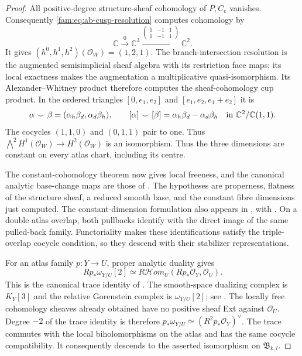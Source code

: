 \begin{proof}
All positive-degree structure-sheaf cohomology of $P,C_e$ vanishes.
Consequently \eqref{fam:eq:ab-cusp-resolution} computes cohomology by
\[
 \mathbb C\xrightarrow{0}\mathbb C^3
 \xrightarrow{\left(\begin{smallmatrix}1&-1&1\\1&-1&1\end{smallmatrix}\right)}
 \mathbb C^2.
\]
It gives $(h^0,h^1,h^2)(\mathcal O_W)=(1,2,1)$.
The branch-intersection resolution
is the augmented semisimplicial sheaf algebra with its restriction face
maps; its local exactness makes the augmentation a multiplicative
quasi-isomorphism. Its Alexander--Whitney product therefore computes
the sheaf-cohomology cup product. In the ordered triangles
$[0,e_1,e_2]$ and $[e_1,e_2,e_1+e_2]$ it is
\[
 \alpha\smile\beta=(\alpha_h\beta_d,\alpha_d\beta_h),
 \qquad [\alpha]\smile[\beta]
 =\alpha_h\beta_d-\alpha_d\beta_h
 \quad\hbox{in }\mathbb C^2/\mathbb C(1,1).
\]
The cocycles $(1,1,0)$ and $(0,1,1)$ pair to one. Thus
$\bigwedge^2H^1(\mathcal O_W)\to H^2(\mathcal O_W)$ is an
isomorphism.
Thus the three dimensions are constant on every
atlas chart, including its centre.

The constant-cohomology theorem
\cite[Chapter III, Theorem 4.12(ii), pp.~134--135]{BS76}
now gives local freeness, and the canonical analytic base-change
maps are those of
\cite[Chapter III, Theorem 4.10, pp.~132--133]{BS76}.
The hypotheses are properness, flatness of the structure sheaf,
a reduced smooth base, and the constant fibre dimensions just
computed. The constant-dimension formulation also appears in
\cite[Section 7, Satz 5, pp.~63--64]{Grauert60}, with
\cite[pp.~35--36]{Grauert1963ErratumD}.
On a double atlas overlap, both pullbacks identify with the direct
image of the same pulled-back family. Functoriality makes these
identifications satisfy the triple-overlap cocycle condition, so
they descend with their stabilizer representations.

For an atlas family $p:Y\to U$, proper analytic duality gives
\[
 Rp_*\omega_{Y/U}[2]
 \simeq R\mathcal Hom_U(Rp_*\mathcal O_Y,\mathcal O_U).
\]
This is the canonical trace identity of
\cite[introduction, equation (1), p.~261; Section 1, pp.~264--265;
Proposition 2.1, p.~266]{RRV71}.
The smooth-space dualizing complex is $K_Y[3]$ and the relative
Gorenstein complex is $\omega_{Y/U}[2]$; see
\cite[Section 3, Theorem 1, p.~81; Proposition 2 and the
complete-intersection calculation, p.~91]{RR70push}.
The locally free cohomology sheaves already obtained have no
positive sheaf Ext against $\mathcal O_U$. Degree $-2$ of the
trace identity is therefore
$p_*\omega_{Y/U}\simeq(R^2p_*\mathcal O_Y)^\vee$.
The trace commutes with the local biholomorphisms on the atlas
and has the same cocycle compatibility. It consequently descends
to the asserted isomorphism on $\mathfrak B_{k,l}$.
\end{proof}